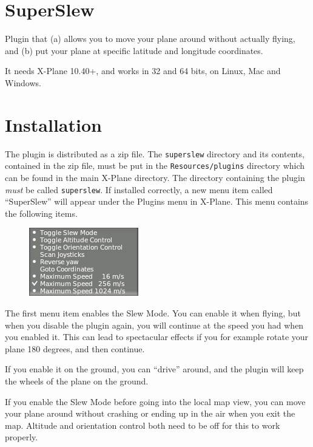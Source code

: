 \documentclass[a4paper,12pt]{article}
\begin{document}
\section*{SuperSlew}

Plugin that (a) allows you to move your plane around without actually
flying, and (b) put your plane at specific latitude and longitude coordinates.

\vspace{0.5\baselineskip}
It needs X-Plane 10.40+, and works in 32 and 64 bits, on Linux, Mac
and Windows.

\section*{Installation}

The plugin is distributed as a zip file. The \texttt{superslew}
directory and its contents, contained in the zip file, must be put in
the \texttt{Resources/plugins} directory which can be found in the
main X-Plane directory. The directory containing the plugin
\textsl{must} be called \texttt{superslew}. If installed correctly, a
new menu item called ``SuperSlew'' will appear under the Plugins menu
in X-Plane. This menu contains the following items. 

\begin{figure}[h!]%
\centering
\includegraphics[scale=1]{slewstandard.png}
\label{fig:slewstandard}
\end{figure}

The first menu item enables the Slew Mode. You can enable it when
flying, but when you disable the plugin again, you will continue at
the speed you had when you enabled it. This can lead to spectacular
effects if you for example rotate your plane 180 degrees, and then
continue. 

If you enable it on the ground, you can ``drive'' around, and the
plugin will keep the wheels of the plane on the ground.

If you enable the Slew Mode before going into the local map view, you
can move your plane around without crashing or ending up in the air
when you exit the map. Altitude and orientation control both need to be off for
this to work properly.
\end{document}
